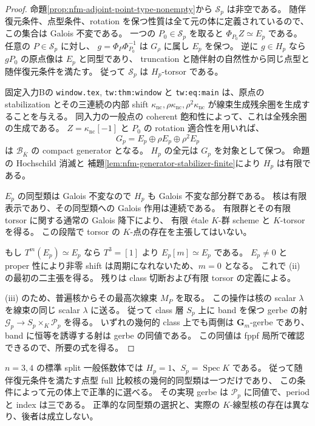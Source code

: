 \begin{proof}
命題\ref{prop:nfm-adjoint-point-type-nonempty}から $\mathscr S_p$ は非空である。
随伴復元条件、点型条件、rotation を保つ性質は全て元の体に定義されているので、
この集合は Galois 不変である。
一つの $P_0\in\mathscr S_p$ を取ると $\Phi_{P_0}Z\simeq E_p$ である。
任意の $P\in\mathscr S_p$ に対し、
$g=\Phi_P\Phi_{P_0}^{-1}$ は $G_\rho$ に属し $E_p$ を保つ。
逆に $g\in H_p$ なら $gP_0$ の原点像は $E_p$ と同型であり、
truncation と随伴射の自然性から同じ点型と随伴復元条件を満たす。
従って $\mathscr S_p$ は $H_p$-torsor である。

固定入力Bの \texttt{window.tex}, \texttt{tw:thm:window} と
\texttt{tw:eq:main} は、原点の stabilization とその三連続の内部 shift
$\kappa_{\mathrm{nc}},\rho\kappa_{\mathrm{nc}},\rho^2\kappa_{\mathrm{nc}}$
が線束生成残余圏を生成することを与える。
同入力の一般点の coherent 飽和性によって、これは全残余圏の生成である。
$Z=\kappa_{\mathrm{nc}}[-1]$ と $P_0$ の rotation 適合性を用いれば、
\[
 G_p=E_p\oplus\rho E_p\oplus\rho^2E_p
\]
は $\mathcal B_{\overline K}$ の compact generator となる。
$H_p$ の全元は $G_p$ を対象として保つ。
命題の Hochschild 消滅と
補題\ref{lem:nfm-generator-stabilizer-finite}により $H_p$ は有限である。

$E_p$ の同型類は Galois 不変なので $H_p$ も Galois 不変な部分群である。
核は有限表示であり、その同型類への Galois 作用は連続である。
有限群とその有限 torsor に関する通常の Galois 降下により、
有限 \'etale $K$-群 scheme と $K$-torsor を得る。
この段階で torsor の $K$-点の存在を主張してはいない。

もし $T^m(E_p)\simeq E_p$ なら $T^3=[1]$ より $E_p[m]\simeq E_p$ である。
$E_p\ne0$ と proper 性により非零 shift は周期になれないため、$m=0$ となる。
これで \textup{(ii)} の最初の二主張を得る。
残りは class 切断および有限 torsor の定義による。

\textup{(iii)} のため、普遍核からその最高次線束 $M_P$ を取る。
この操作は核の scalar $\lambda$ を線束の同じ scalar $\lambda$ に送る。
従って class 層 $S_p$ 上に band を保つ gerbe の射
$\mathscr G_p\to S_p\times_K\mathscr P_p$ を得る。
いずれの幾何的 class 上でも両側は $\mathbf G_m$-gerbe であり、
band に恒等を誘導する射は gerbe の同値である。
この同値は fppf 局所で確認できるので、所要の式を得る。
\end{proof}

\begin{corollary}
\label{cor:nfm-low-dimensional-canonical-adjoint-class}
$n=3,4$ の標準 split 一般係数体では $H_p=1$、$S_p=\operatorname{Spec}K$ である。
従って随伴復元条件を満たす点型 full 比較核の幾何的同型類は一つだけであり、
この条件によって元の体上で正準的に選べる。
その実現 gerbe は $\mathscr P_p$ に同値で、period と index は三である。
正準的な同型類の選択と、実際の $K$-線型核の存在は異なり、後者は成立しない。
\end{corollary}

